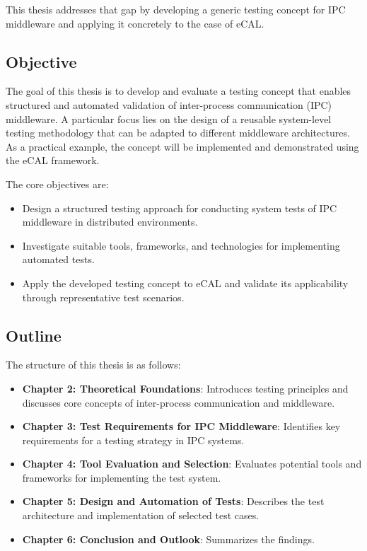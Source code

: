\vspace{1em}
This thesis addresses that gap by developing a generic testing concept for IPC middleware and applying it concretely to the case of eCAL.

\subsection{Objective}

The goal of this thesis is to develop and evaluate a testing concept that enables structured and automated validation of inter-process communication (IPC) middleware. A particular focus lies on the design of a reusable system-level testing methodology that can be adapted to different middleware architectures. As a practical example, the concept will be implemented and demonstrated using the eCAL framework.

\vspace{1em}
The core objectives are:

\begin{itemize}
	\item Design a structured testing approach for conducting system tests of IPC middleware in distributed environments.
	\item Investigate suitable tools, frameworks, and technologies for implementing automated tests.
	\item Apply the developed testing concept to eCAL and validate its applicability through representative test scenarios.
\end{itemize}

\subsection{Outline}

The structure of this thesis is as follows:

\begin{itemize}
	\item \textbf{Chapter 2: Theoretical Foundations}: Introduces testing principles and discusses core concepts of inter-process communication and middleware.
	\item \textbf{Chapter 3: Test Requirements for IPC Middleware}: Identifies key requirements for a testing strategy in IPC systems.
	\item \textbf{Chapter 4: Tool Evaluation and Selection}: Evaluates potential tools and frameworks for implementing the test system.
	\item \textbf{Chapter 5: Design and Automation of Tests}: Describes the test architecture and implementation of selected test cases.
	\item \textbf{Chapter 6: Conclusion and Outlook}: Summarizes the findings.
\end{itemize}







